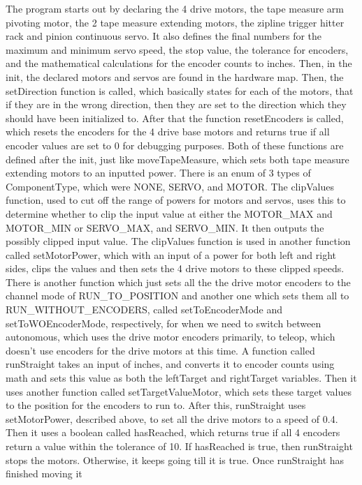 \documentclass[11pt,fleqn]{article}
\begin{document}
The program starts out by declaring the 4 drive motors, the tape measure arm pivoting motor, the 2
tape measure extending motors, the zipline trigger hitter rack and pinion continuous servo. It also
defines the final numbers for the maximum and minimum servo speed, the stop value, the tolerance for
encoders, and the mathematical calculations for the encoder counts to inches. Then, in the init, the
declared motors and servos are found in the hardware map. Then, the setDirection function is called,
which basically states for each of the motors, that if they are in the wrong direction, then they
are set to the direction which they should have been initialized to. After that the function
resetEncoders is called, which resets the encoders for the 4 drive base motors and returns true if
all encoder values are set to 0 for debugging purposes. Both of these functions are defined after
the init, just like moveTapeMeasure, which sets both tape measure extending motors to an inputted
power. There is an enum of 3 types of ComponentType, which were NONE, SERVO, and MOTOR. The
clipValues function, used to cut off the range of powers for motors and servos, uses this to
determine whether to clip the input value at either the MOTOR\_MAX and MOTOR\_MIN or SERVO\_MAX, and
SERVO\_MIN. It then outputs the possibly clipped input value. The clipValues function is used in
another function called setMotorPower, which with an input of a power for both left and right sides,
clips the values and then sets the 4 drive motors to these clipped speeds. There is another function
which just sets all the the drive motor encoders to the channel mode of RUN\_TO\_POSITION and
another one which sets them all to  RUN\_WITHOUT\_ENCODERS, called setToEncoderMode and
setToWOEncoderMode, respectively, for when we need to switch between autonomous, which uses the
drive motor encoders primarily, to teleop, which doesn't use encoders for the drive motors at this
time. A function called runStraight takes an input of inches, and converts it to encoder counts
using math and sets this value as both the leftTarget and rightTarget variables. Then it uses
another function called setTargetValueMotor, which sets these target values to the position for the
encoders to run to. After this, runStraight uses setMotorPower, described above, to set all the
drive motors to a speed of 0.4. Then it uses a boolean called hasReached, which returns true if all
4 encoders return a value within the tolerance of 10. If hasReached is true, then runStraight stops
the motors. Otherwise, it keeps going till it is true. Once runStraight has finished moving it
\end{document}
